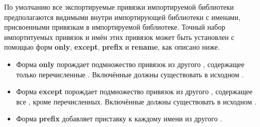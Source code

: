 По умолчанию все экспортируемые привязки импортируемой библиотеки предполагаются видимыми
внутри импортирующей библиотеки с именами, присвоенными привязкам в импортируемой
библиотеке. Точный набор импортитуемых привязок и имён этих привязок может быть установлен с
помощью форм {\cf\bfseries only}, {\cf\bfseries except}, {\cf\bfseries prefix} и {\cf\bfseries
rename}, как описано ниже.\vspace{1mm}

\begin{itemize}
\item Форма {\cf\bfseries only} порождает подмножество привязок из другого ,
  содержащее только перечисленные . Включённые  должны
  существовать в исходном .
\item Форма {\cf\bfseries except} порождает подмножество привязок из другого ,
  содержащее все , кроме перечисленных. Включённые  должны
  существовать в исходном .
\item Форма {\cf\bfseries prefix} добавляет приставку  к каждому
  имени из другого .

\end{itemize}
